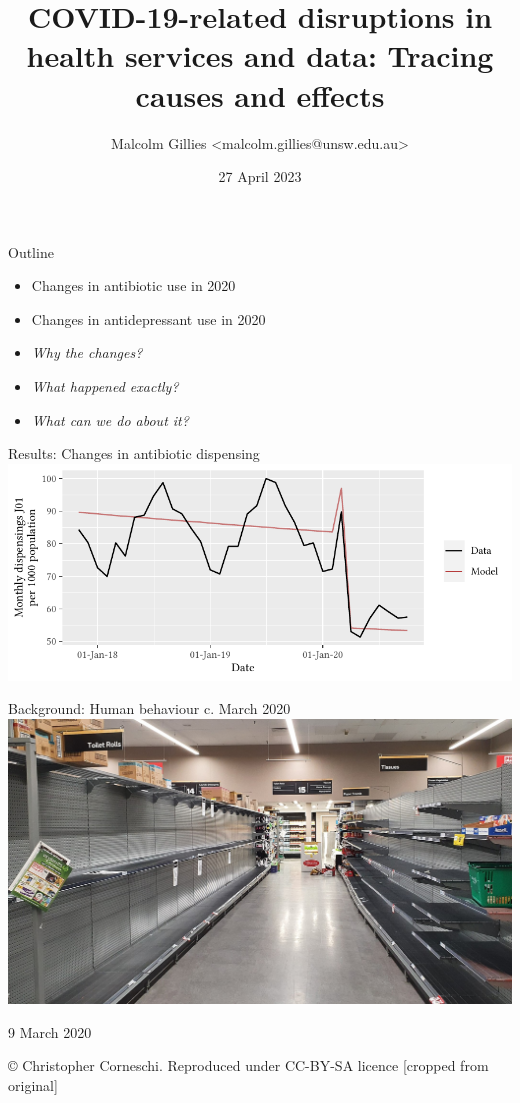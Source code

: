 \documentclass[aspectratio=169,12pt]{beamer} %
\title{COVID-19-related disruptions in health services and data: Tracing causes and effects}
\author{Malcolm Gillies <malcolm.gillies@unsw.edu.au>}
\date{27 April 2023}
\begin{document}
{
\begin{frame}
\titlepage
\end{frame}
}

\begin{frame}{Outline}
	\begin{itemize}
		\item Changes in antibiotic use in 2020
		\item Changes in antidepressant use in 2020
		\item \emph{Why the changes?}
		\item \emph{What happened exactly?}
		\item \emph{What can we do about it?}
	\end{itemize}
\end{frame}

\begin{frame}{Results: Changes in antibiotic dispensing}
\centering
\includegraphics{ref/latex-j01armap3-1.pdf}
\end{frame}

\begin{frame}{Background: Human behaviour c. March 2020}
\centering
\includegraphics[height=0.75\textheight]
	{ref/toilet-paper-crop.jpg}

	\tiny 9 March 2020

	\copyright\: Christopher Corneschi.
	Reproduced under CC-BY-SA licence [cropped from original]
\end{frame}
\end{document}
